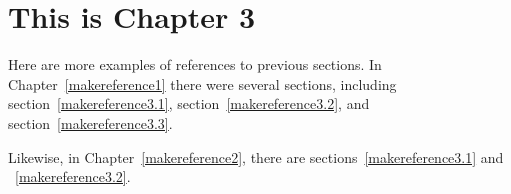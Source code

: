 
\cleardoublepage


\chapter{This is Chapter 3}
\label{makereference3}

Here are more examples of references to previous sections.  In Chapter~\ref{makereference1} there were several sections, including section~\ref{makereference3.1}, section~\ref{makereference3.2}, and section~\ref{makereference3.3}.

Likewise, in Chapter~\ref{makereference2}, there are sections~\ref{makereference3.1} and ~\ref{makereference3.2}.
